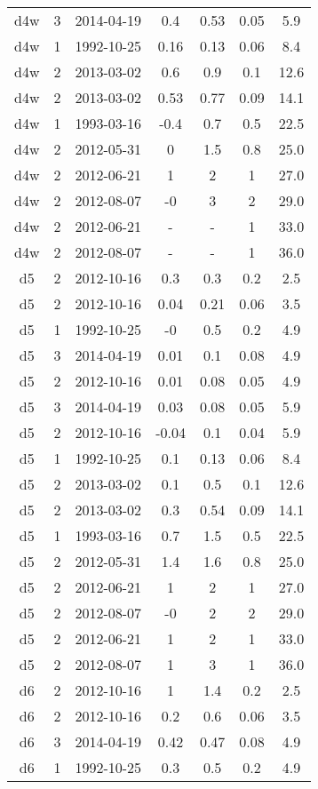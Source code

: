 \begin{table*}[htp]
\begin{tabular}{ccccccc}
d4w & 3 & 2014-04-19 & 0.4 & 0.53 & 0.05 & 5.9 \\
d4w & 1 & 1992-10-25 & 0.16 & 0.13 & 0.06 & 8.4 \\
d4w & 2 & 2013-03-02 & 0.6 & 0.9 & 0.1 & 12.6 \\
d4w & 2 & 2013-03-02 & 0.53 & 0.77 & 0.09 & 14.1 \\
d4w & 1 & 1993-03-16 & -0.4 & 0.7 & 0.5 & 22.5 \\
d4w & 2 & 2012-05-31 & 0 & 1.5 & 0.8 & 25.0 \\
d4w & 2 & 2012-06-21 & 1 & 2 & 1 & 27.0 \\
d4w & 2 & 2012-08-07 & -0 & 3 & 2 & 29.0 \\
d4w & 2 & 2012-06-21 & - & - & 1 & 33.0 \\
d4w & 2 & 2012-08-07 & - & - & 1 & 36.0 \\
d5 & 2 & 2012-10-16 & 0.3 & 0.3 & 0.2 & 2.5 \\
d5 & 2 & 2012-10-16 & 0.04 & 0.21 & 0.06 & 3.5 \\
d5 & 1 & 1992-10-25 & -0 & 0.5 & 0.2 & 4.9 \\
d5 & 3 & 2014-04-19 & 0.01 & 0.1 & 0.08 & 4.9 \\
d5 & 2 & 2012-10-16 & 0.01 & 0.08 & 0.05 & 4.9 \\
d5 & 3 & 2014-04-19 & 0.03 & 0.08 & 0.05 & 5.9 \\
d5 & 2 & 2012-10-16 & -0.04 & 0.1 & 0.04 & 5.9 \\
d5 & 1 & 1992-10-25 & 0.1 & 0.13 & 0.06 & 8.4 \\
d5 & 2 & 2013-03-02 & 0.1 & 0.5 & 0.1 & 12.6 \\
d5 & 2 & 2013-03-02 & 0.3 & 0.54 & 0.09 & 14.1 \\
d5 & 1 & 1993-03-16 & 0.7 & 1.5 & 0.5 & 22.5 \\
d5 & 2 & 2012-05-31 & 1.4 & 1.6 & 0.8 & 25.0 \\
d5 & 2 & 2012-06-21 & 1 & 2 & 1 & 27.0 \\
d5 & 2 & 2012-08-07 & -0 & 2 & 2 & 29.0 \\
d5 & 2 & 2012-06-21 & 1 & 2 & 1 & 33.0 \\
d5 & 2 & 2012-08-07 & 1 & 3 & 1 & 36.0 \\
d6 & 2 & 2012-10-16 & 1 & 1.4 & 0.2 & 2.5 \\
d6 & 2 & 2012-10-16 & 0.2 & 0.6 & 0.06 & 3.5 \\
d6 & 3 & 2014-04-19 & 0.42 & 0.47 & 0.08 & 4.9 \\
d6 & 1 & 1992-10-25 & 0.3 & 0.5 & 0.2 & 4.9 \\

\end{tabular}
\end{table*}
